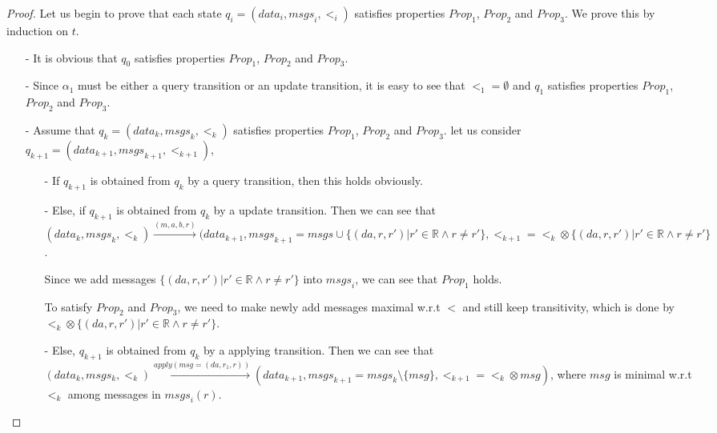 \begin {proof}
Let us begin to prove that each state $q_i=(\mathit{data}_i,\mathit{msgs}_i,<_i)$ satisfies properties $\mathit{Prop}_1$, $\mathit{Prop}_2$ and $\mathit{Prop}_3$. We prove this by induction on $t$.

\begin{itemize}
\setlength{\itemsep}{0.5pt}
\item[-] It is obvious that $q_0$ satisfies properties $\mathit{Prop}_1$, $\mathit{Prop}_2$ and $\mathit{Prop}_3$.

\item[-] Since $\alpha_1$ must be either a query transition or an update transition, it is easy to see that $<_1 = \emptyset$ and $q_1$ satisfies properties $\mathit{Prop}_1$, $\mathit{Prop}_2$ and $\mathit{Prop}_3$.

\item[-] Assume that $q_k=(\mathit{data}_k,\mathit{msgs}_k,<_k)$ satisfies properties $\mathit{Prop}_1$, $\mathit{Prop}_2$ and $\mathit{Prop}_3$. let us consider $q_{k+1}= (\mathit{data}_{k+1},\mathit{msgs}_{k+1},<_{k+1})$,

    \begin{itemize}
    \setlength{\itemsep}{0.5pt}
    \item[-] If $q_{k+1}$ is obtained from $q_k$ by a query transition, then this holds obviously.

    \item[-] Else, if $q_{k+1}$ is obtained from $q_k$ by a update transition. Then we can see that $(\mathit{data}_k,\mathit{msgs}_k,<_k) {\xrightarrow{(m,a,b,r)}} (\mathit{data}_{k+1},\mathit{msgs}_{k+1}= \mathit{msgs} \cup \{ (\mathit{da},r,r') \vert  r' \in \mathbb{R} \wedge r \neq r' \},<_{k+1} = <_k \otimes \{ (\mathit{da},r,r') \vert  r' \in \mathbb{R} \wedge r \neq r' \}$.

        Since we add messages $\{ (\mathit{da},r,r') \vert  r' \in \mathbb{R} \wedge r \neq r' \}$ into $\mathit{msgs}_i$, we can see that $\mathit{Prop}_1$ holds.

        To satisfy $\mathit{Prop}_2$ and $\mathit{Prop}_3$, we need to make newly add messages maximal w.r.t $<$ and still keep transitivity, which is done by $<_k \otimes \{ (\mathit{da},r,r') \vert  r' \in \mathbb{R} \wedge r \neq r' \}$.

    \item[-] Else, $q_{k+1}$ is obtained from $q_k$ by a applying transition. Then we can see that $(\mathit{data}_k,msgs_k,<_k) {\xrightarrow{apply(\mathit{msg}=(\mathit{da},r_1,r))}} (\mathit{data}_{k+1},\mathit{msgs}_{k+1} = \mathit{msgs}_k \setminus \{ \mathit{msg} \}, <_{k+1} = <_k \otimes \mathit{msg} )$, where $\mathit{msg}$ is minimal w.r.t $<_k$ among messages in $\mathit{msgs}_i(r)$.


\end{itemize}
\end{itemize}
\end{proof}
